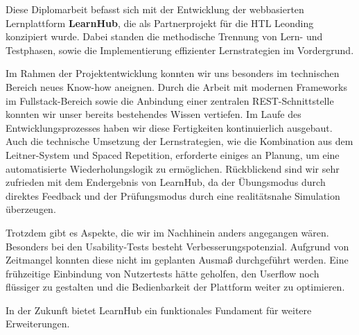 

Diese Diplomarbeit befasst sich mit der Entwicklung der webbasierten Lernplattform \textbf{LearnHub}, die als Partnerprojekt für die HTL Leonding konzipiert wurde. Dabei standen die methodische Trennung von Lern- und Testphasen, sowie die Implementierung effizienter Lernstrategien im Vordergrund.

Im Rahmen der Projektentwicklung konnten wir uns besonders im technischen Bereich neues Know-how aneignen. Durch die Arbeit mit modernen Frameworks im Fullstack-Bereich sowie die Anbindung einer zentralen REST-Schnittstelle konnten wir unser bereits bestehendes Wissen vertiefen. Im Laufe des Entwicklungsprozesses haben wir diese Fertigkeiten kontinuierlich ausgebaut. Auch die technische Umsetzung der Lernstrategien, wie die Kombination aus dem Leitner-System und Spaced Repetition, erforderte einiges an Planung, um eine automatisierte Wiederholungslogik zu ermöglichen. Rückblickend sind wir sehr zufrieden mit dem Endergebnis von LearnHub, da der Übungsmodus durch direktes Feedback und der Prüfungsmodus durch eine realitätsnahe Simulation überzeugen.

Trotzdem gibt es Aspekte, die wir im Nachhinein anders angegangen wären. Besonders bei den Usability-Tests besteht Verbesserungspotenzial. Aufgrund von Zeitmangel konnten diese nicht im geplanten Ausmaß durchgeführt werden. Eine frühzeitige Einbindung von Nutzertests hätte geholfen, den Userflow noch flüssiger zu gestalten und die Bedienbarkeit der Plattform weiter zu optimieren.

In der Zukunft bietet LearnHub ein funktionales Fundament für weitere Erweiterungen.